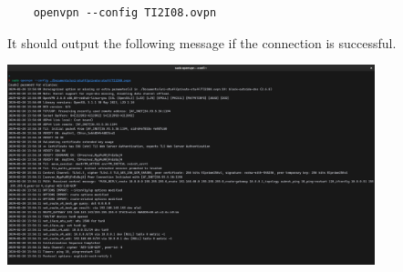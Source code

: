 \documentclass[12pt,titlepage]{article}
\begin{document}
\begin{verbatim}
    openvpn --config TI2I08.ovpn
\end{verbatim}

It should output the following message if the connection is successful.

\begin{center}
    \includegraphics[width=0.8\textwidth]{./images/openvpn-connected.png}
\end{center}
\end{document}
